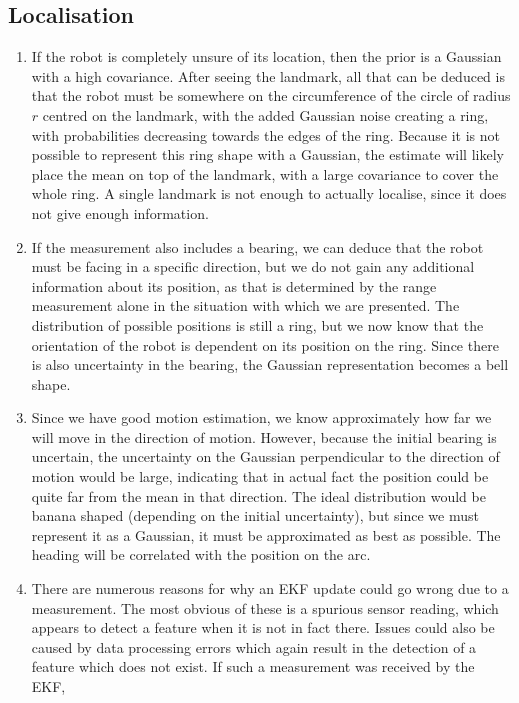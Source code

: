 \documentclass[a4paper,12pt]{article}
\begin{document}
\subsection{Localisation}
\begin{enumerate}[resume]
\item If the robot is completely unsure of its location, then the prior is a
  Gaussian with a high covariance. After seeing the landmark, all that can be
  deduced is that the robot must be somewhere on the circumference of the circle
  of radius $r$ centred on the landmark, with the added Gaussian noise creating
  a ring, with probabilities decreasing towards the edges of the ring. Because
  it is not possible to represent this ring shape with a Gaussian, the estimate
  will likely place the mean on top of the landmark, with a large covariance to
  cover the whole ring. A single landmark is not enough to actually localise,
  since it does not give enough information.
\item If the measurement also includes a bearing, we can deduce that the robot
  must be facing in a specific direction, but we do not gain any additional
  information about its position, as that is determined by the range measurement
  alone in the situation with which we are presented. The distribution of
  possible positions is still a ring, but we now know that the orientation of
  the robot is dependent on its position on the ring. Since there is also
  uncertainty in the bearing, the Gaussian representation becomes a bell shape.
\item Since we have good motion estimation, we know approximately how far we
  will move in the direction of motion. However, because the initial bearing is
  uncertain, the uncertainty on the Gaussian perpendicular to the direction of
  motion would be large, indicating that in actual fact the position could be
  quite far from the mean in that direction. The ideal distribution would be
  banana shaped (depending on the initial uncertainty), but since we must
  represent it as a Gaussian, it must be approximated as best as possible. The
  heading will be correlated with the position on the arc.
\item There are numerous reasons for why an EKF update could go wrong due to a
  measurement. The most obvious of these is a spurious sensor reading, which
  appears to detect a feature when it is not in fact there. Issues could also be
  caused by data processing errors which again result in the detection of a
  feature which does not exist. If such a measurement was received by the EKF,

\end{enumerate}
\end{document}
